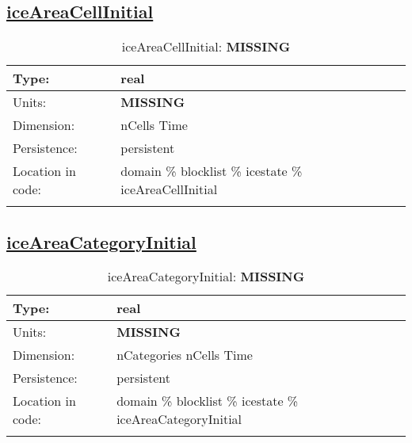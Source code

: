 \subsection[iceAreaCellInitial]{\hyperref[sec:var_tab_icestate]{iceAreaCellInitial}}
\label{subsec:var_sec_icestate_iceAreaCellInitial}
\begin{center}
\begin{longtable}{| p{2.0in} | p{4.0in} |}
        \hline 
        Type: & real \\
        \hline 
        Units: & {\bf \color{red} MISSING} \\
        \hline 
        Dimension: & nCells Time \\
        \hline 
        Persistence: & persistent \\
        \hline 
         Location in code: & domain \% blocklist \% icestate \% iceAreaCellInitial \\
         \hline 
    \caption{iceAreaCellInitial: {\bf \color{red} MISSING}}
\end{longtable}
\end{center}
\subsection[iceAreaCategoryInitial]{\hyperref[sec:var_tab_icestate]{iceAreaCategoryInitial}}
\label{subsec:var_sec_icestate_iceAreaCategoryInitial}
\begin{center}
\begin{longtable}{| p{2.0in} | p{4.0in} |}
        \hline 
        Type: & real \\
        \hline 
        Units: & {\bf \color{red} MISSING} \\
        \hline 
        Dimension: & nCategories nCells Time \\
        \hline 
        Persistence: & persistent \\
        \hline 
         Location in code: & domain \% blocklist \% icestate \% iceAreaCategoryInitial \\
         \hline 
    \caption{iceAreaCategoryInitial: {\bf \color{red} MISSING}}
\end{longtable}
\end{center}
